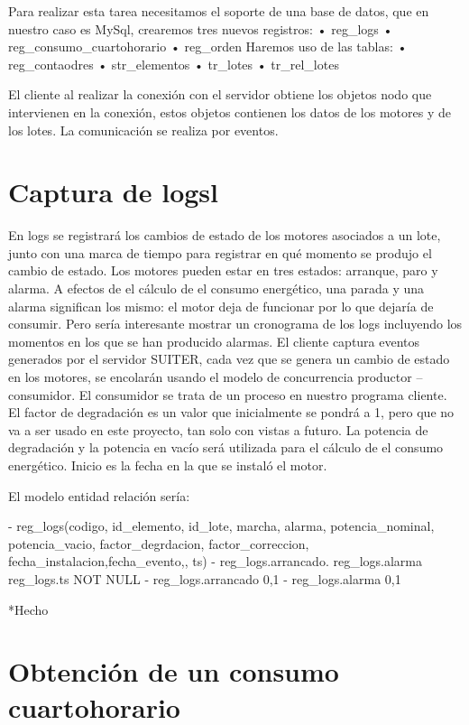 Para realizar esta tarea necesitamos el soporte de una base de datos,
 que en nuestro caso es MySql, crearemos tres nuevos registros:
•	reg_logs
•	reg_consumo_cuartohorario
•	reg_orden
Haremos uso de las tablas:
•	reg_contaodres
•	str_elementos
•	tr_lotes
•	tr_rel_lotes

El cliente al realizar la conexión con el servidor obtiene los objetos nodo que intervienen en la 
conexión, estos objetos contienen los datos de los motores y de los lotes. La comunicación se 
realiza por eventos.

\section*{Captura de logsl}

En logs se registrará los cambios de estado de los motores asociados a un lote, junto con 
una marca de tiempo para registrar en qué momento se produjo el cambio de estado. Los motores
 pueden estar en tres estados: arranque, paro y alarma. A efectos de el cálculo de el consumo
 energético, una parada y una alarma significan los mismo: el motor deja de funcionar por lo que 
dejaría de consumir. Pero sería interesante mostrar un cronograma de los logs incluyendo los 
momentos en los que se han producido alarmas. El cliente captura eventos generados por el
servidor SUITER, cada vez que se genera un cambio de estado en los motores, se encolarán
 usando el modelo de concurrencia productor – consumidor. El consumidor se trata de un proceso
 en nuestro programa cliente. El factor de degradación es un valor que inicialmente se pondrá
 a 1, pero que no va a ser usado en este proyecto, tan solo con vistas a futuro. La potencia 
de degradación y la potencia en vacío será utilizada para el cálculo de el consumo energético. 
Inicio es la fecha en la que se instaló el motor.

El modelo entidad relación sería:

-	reg_logs(codigo, id_elemento, id_lote, marcha, alarma, potencia_nominal, potencia_vacio, factor_degrdacion, factor_correccion, fecha_instalacion,fecha_evento,, ts)
-	reg_logs.arrancado. reg_logs.alarma reg_logs.ts NOT NULL
-	reg_logs.arrancado {0,1}
-	reg_logs.alarma {0,1}

*Hecho

\section*{Obtención de un consumo cuartohorario}

